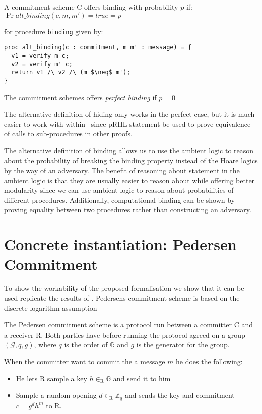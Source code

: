 \begin{definition}
  \label{def:commitment:alt-binding}
  A commitment scheme C offers binding with probability $p$ if:
  $\Pr{alt\_{binding}(c, m, m') = true} = p$

  for procedure \texttt{binding} given by:
\begin{lstlisting}[mathescape]
proc alt_binding(c : commitment, m m' : message) = {
  v1 = verify m c;
  v2 = verify m' c;
  return v1 /\ v2 /\ (m $\neq$ m');
}
\end{lstlisting}

  The commitment schemes offers \textit{perfect binding} if $p = 0$
\end{definition}

The alternative definition of hiding only works in the perfect case, but it is much easier
to work with within \easycrypt\  since pRHL statement be used to prove
equivalence of calls to sub-procedures in other proofs.

The alternative definition of binding allows us to use the ambient logic to
reason about the probability of breaking the binding property instead of the
Hoare logics by the way of an adversary. The benefit of reasoning about
statement in the ambient logic is that they are usually easier to reason about
while offering better modularity since we can use ambient logic to
reason about probabilities of different procedures.
Additionally, computational binding can be shown by proving equality between two
procedures rather than constructing an adversary.


\section{Concrete instantiation: Pedersen Commitment}
\label{sec:pedersen}

To show the workability of the proposed formalisation we show that it can be
used replicate the results of \citet{DBLP:journals/corr/MetereD17}. Pedersens
commitment scheme is based on the discrete logarithm assumption

The Pedersen commitment scheme is a protocol run between a committer C and a
receiver R. Both parties have before running the protocol agreed on a group
$(\mathcal{G}, q, g)$, where $q$ is the order of $\mathbb{G}$ and $g$ is the
generator for the group.

When the committer want to commit the a message $m$ he does the following:
\begin{itemize}
  \item He lets R sample a key $h \in_{\text{R}} \mathbb{G}$ and send it to him
  \item Sample a random opening $d \in_{\text{R}} \mathbb{Z}_{q}$ and sends the
    key and commitment $c = g^{d}h^{m}$ to R.
\end{itemize}

